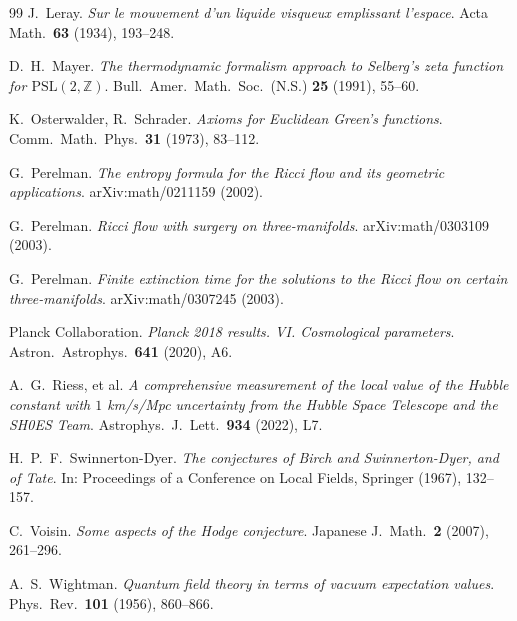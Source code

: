 \documentclass[11pt,a4paper,reqno]{amsart}
\theoremstyle{plain}
\theoremstyle{definition}
\theoremstyle{remark}
\begin{document}
\begin{thebibliography}{99}
 J.\ Leray. \emph{Sur le mouvement d'un liquide
visqueux emplissant l'espace}. Acta Math.\ \textbf{63} (1934), 193--248.

 D.\ H.\ Mayer. \emph{The thermodynamic
formalism approach to Selberg's zeta function for $\mathrm{PSL}(2,\mathbb{Z})$}.
Bull.\ Amer.\ Math.\ Soc.\ (N.S.) \textbf{25} (1991), 55--60.

 K.\ Osterwalder, R.\ Schrader. \emph{Axioms
for Euclidean Green's functions}. Comm.\ Math.\ Phys.\ \textbf{31}
(1973), 83--112.

 G.\ Perelman. \emph{The entropy formula
for the Ricci flow and its geometric applications}. arXiv:math/0211159
(2002).

 G.\ Perelman. \emph{Ricci flow with surgery
on three-manifolds}. arXiv:math/0303109 (2003).

 G.\ Perelman. \emph{Finite extinction time
for the solutions to the Ricci flow on certain three-manifolds}.
arXiv:math/0307245 (2003).

 Planck Collaboration. \emph{Planck 2018 results.
VI. Cosmological parameters}. Astron.\ Astrophys.\ \textbf{641} (2020),
A6.

 A.\ G.\ Riess, et al. \emph{A comprehensive
measurement of the local value of the Hubble constant with $1$ km/s/Mpc
uncertainty from the Hubble Space Telescope and the SH0ES Team}.
Astrophys.\ J.\ Lett.\ \textbf{934} (2022), L7.

 H.\ P.\ F.\
Swinnerton-Dyer. \emph{The conjectures of Birch and Swinnerton-Dyer,
and of Tate}. In: Proceedings of a Conference on Local Fields, Springer
(1967), 132--157.

 C.\ Voisin. \emph{Some aspects of the Hodge
conjecture}. Japanese J.\ Math.\ \textbf{2} (2007), 261--296.

 A.\ S.\ Wightman. \emph{Quantum field theory
in terms of vacuum expectation values}. Phys.\ Rev.\ \textbf{101}
(1956), 860--866.

\end{thebibliography}
\end{document}
